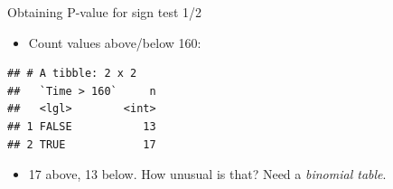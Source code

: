 \documentclass[ignorenonframetext,]{beamer}
\newenvironment{Shaded}{\begin{snugshade}}{\end{snugshade}}
\newcommand{\DecValTok}[1]{\textcolor[rgb]{0.00,0.00,0.81}{#1}}
\newcommand{\KeywordTok}[1]{\textcolor[rgb]{0.13,0.29,0.53}{\textbf{#1}}}
\newcommand{\NormalTok}[1]{#1}
\newcommand{\OperatorTok}[1]{\textcolor[rgb]{0.81,0.36,0.00}{\textbf{#1}}}
\newcommand{\StringTok}[1]{\textcolor[rgb]{0.31,0.60,0.02}{#1}}
\providecommand{\tightlist}{%
  \setlength{\itemsep}{0pt}\setlength{\parskip}{0pt}}
\begin{document}
\begin{frame}[fragile]{Obtaining P-value for sign test 1/2}
\protect\hypertarget{obtaining-p-value-for-sign-test-12}{}

\begin{itemize}
\tightlist
\item
  Count values above/below 160:
\end{itemize}

\begin{Shaded}
\end{Shaded}

\begin{verbatim}
## # A tibble: 2 x 2
##   `Time > 160`     n
##   <lgl>        <int>
## 1 FALSE           13
## 2 TRUE            17
\end{verbatim}

\begin{itemize}
\tightlist
\item
  17 above, 13 below. How unusual is that? Need a \emph{binomial table}.
\end{itemize}

\end{frame}
\end{document}
